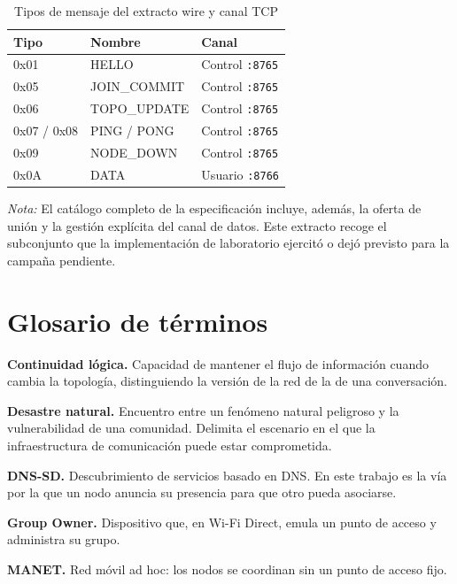 \documentclass[12pt,oneside]{scrreprt}
\begin{document}
\begin{table}[H]
\centering
\singlespacing
\caption{Tipos de mensaje del extracto wire y canal TCP}
\label{tab:anexo-wire}
\renewcommand{\arraystretch}{1.15}
\begin{tabular}{@{}lll@{}}
\toprule
Tipo & Nombre & Canal \\
\midrule
0x01 & HELLO & Control \texttt{:8765} \\
0x05 & JOIN\_COMMIT & Control \texttt{:8765} \\
0x06 & TOPO\_UPDATE & Control \texttt{:8765} \\
0x07 / 0x08 & PING / PONG & Control \texttt{:8765} \\
0x09 & NODE\_DOWN & Control \texttt{:8765} \\
0x0A & DATA & Usuario \texttt{:8766} \\
\bottomrule
\end{tabular}
\par\vspace{0.2cm}
\small \raggedright \textit{Nota:} El catálogo completo de la especificación incluye, además, la oferta de unión y la gestión explícita del canal de datos. Este extracto recoge el subconjunto que la implementación de laboratorio ejercitó o dejó previsto para la campaña pendiente.
\end{table}

\fi
\chapter*{Glosario de términos}

\textbf{Continuidad lógica.} Capacidad de mantener el flujo de información cuando cambia la topología, distinguiendo la versión de la red de la de una conversación.

\textbf{Desastre natural.} Encuentro entre un fenómeno natural peligroso y la vulnerabilidad de una comunidad. Delimita el escenario en el que la infraestructura de comunicación puede estar comprometida.

\textbf{DNS-SD.} Descubrimiento de servicios basado en DNS. En este trabajo es la vía por la que un nodo anuncia su presencia para que otro pueda asociarse.

\textbf{Group Owner.} Dispositivo que, en Wi-Fi Direct, emula un punto de acceso y administra su grupo.

\textbf{MANET.} Red móvil ad hoc: los nodos se coordinan sin un punto de acceso fijo.
\end{document}
